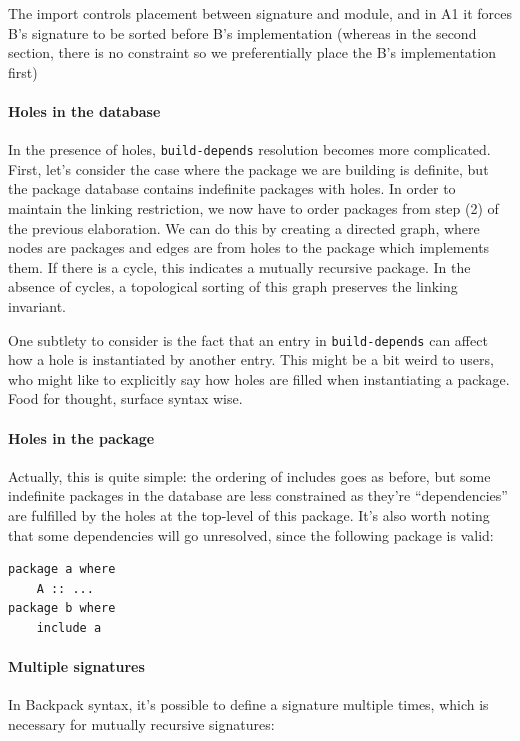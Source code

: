 \documentclass{article}
\begin{document}
The import controls placement between signature and module, and in A1 it
forces B's signature to be sorted before B's implementation (whereas in
the second section, there is no constraint so we preferentially place
the B's implementation first)

\paragraph{Holes in the database} In the presence of holes,
\verb|build-depends| resolution becomes more complicated.  First,
let's consider the case where the package we are building is
definite, but the package database contains indefinite packages with holes.
In order to maintain the linking restriction, we now have to order packages
from step (2) of the previous elaboration.  We can do this by creating
a directed graph, where nodes are packages and edges are from holes to the
package which implements them.  If there is a cycle, this indicates a mutually
recursive package.  In the absence of cycles, a topological sorting of this
graph preserves the linking invariant.

One subtlety to consider is the fact that an entry in \verb|build-depends|
can affect how a hole is instantiated by another entry.  This might be a
bit weird to users, who might like to explicitly say how holes are
filled when instantiating a package.  Food for thought, surface syntax wise.

\paragraph{Holes in the package} Actually, this is quite simple: the
ordering of includes goes as before, but some indefinite packages in the
database are less constrained as they're ``dependencies'' are fulfilled
by the holes at the top-level of this package.  It's also worth noting
that some dependencies will go unresolved, since the following package
is valid:

\begin{verbatim}
package a where
    A :: ...
package b where
    include a
\end{verbatim}

\paragraph{Multiple signatures}  In Backpack syntax, it's possible to
define a signature multiple times, which is necessary for mutually
recursive signatures:
\end{document}
